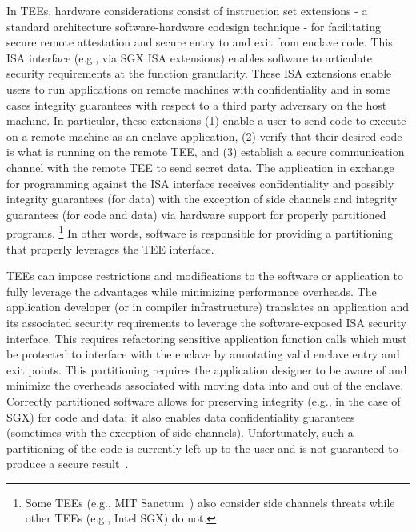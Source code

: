 In TEEs, hardware considerations consist of instruction set extensions - a standard architecture software-hardware codesign technique - for facilitating secure remote attestation and secure entry to and exit from enclave code.
This ISA interface (e.g., via SGX ISA extensions) enables software to articulate security requirements at the function granularity.
These ISA extensions enable users to run applications on remote machines with confidentiality and in some cases integrity guarantees with respect to a third party adversary on the host machine.
In particular, these extensions (1) enable a user to send code to execute on a remote machine as an enclave application, (2) verify that their desired code is what is running on the remote TEE, and (3) establish a secure communication channel with the remote TEE to send secret data.
The application in exchange for programming against the ISA interface receives confidentiality and possibly integrity guarantees (for data) with the exception of side channels and integrity guarantees (for code and data) via hardware support for properly partitioned programs. \footnote{Some TEEs (e.g., MIT Sanctum~\cite{costan2016sanctum}) also consider side channels threats while other TEEs (e.g., Intel SGX) do not.}
In other words, software is responsible for providing a partitioning that properly leverages the TEE interface.

TEEs can impose restrictions and modifications to the software or application to fully leverage the advantages while minimizing performance overheads.
The application developer (or in compiler infrastructure) translates an application and its associated security requirements to leverage the software-exposed ISA security interface.
This requires refactoring sensitive application function calls which must be protected to interface with the enclave by annotating valid enclave entry and exit points.
This partitioning requires the application designer to be aware of and minimize the overheads associated with moving data into and out of the enclave.
Correctly partitioned software allows for preserving integrity (e.g., in the case of SGX) for code and data; it also enables data confidentiality guarantees (sometimes with the exception of side channels).
Unfortunately, such a partitioning of the code is currently left up to the user and is not guaranteed to produce a secure result~\cite{lind2017glamdring, SCONE, graphene}.

